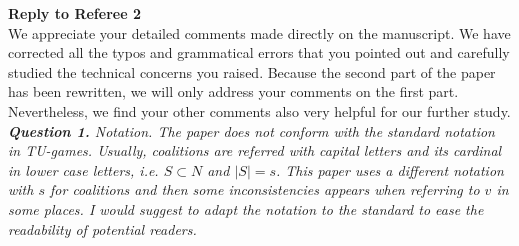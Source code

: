 \documentclass[11pt]{article}
\begin{document}
{{{{{{{\noindent \textbf{\large Reply to Referee 2}
\\[3mm]
We appreciate your detailed comments made directly on the manuscript.
We have corrected all the typos and grammatical errors that you pointed out and carefully studied the technical concerns you raised.
Because the second part of the paper has been rewritten, we will only address your comments on the first part.
Nevertheless, we find your other comments also very helpful for our further study.
\\[4mm]
%
%
%
%
\noindent \textit{\textbf{Question 1.}
Notation. The paper does not conform with the standard notation in
TU-games. Usually, coalitions are referred with capital letters and its
cardinal in lower case letters, i.e. $S \subset N$ and $|S| = s$. This paper uses a different notation with $s$ for coalitions and then some inconsistencies
appears when referring to $v$ in some places. I would suggest to adapt
the notation to the standard to ease the readability of potential readers.}

}}}}}}}
\end{document}
